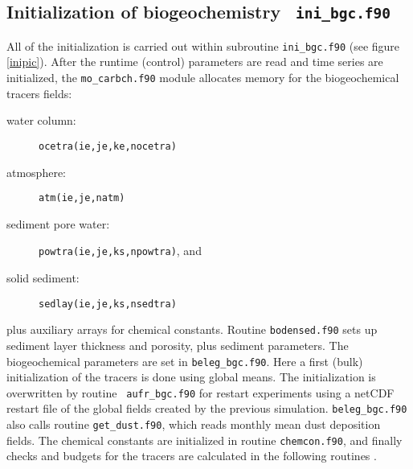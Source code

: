 \documentclass[11pt,a4paper,fleqn,twoside]{article}
\begin{document}
\subsection{\label{initialization}Initialization  of biogeochemistry {\tt
ini\_bgc.f90}}

All of the initialization is carried out within subroutine {\tt ini\_bgc.f90}
(see figure \ref{inipic}). After the runtime (control) parameters are read and
time series are initialized, the {\tt mo\_carbch.f90} module allocates memory
for the biogeochemical tracers fields:

\begin{description} 
\item[water column:] {\tt ocetra(ie,je,ke,nocetra)}
\item[atmosphere:] {\tt atm(ie,je,natm)}
\item[sediment pore water:] {\tt powtra(ie,je,ks,npowtra)}, and
\item[solid sediment:] {\tt sedlay(ie,je,ks,nsedtra)}
\end{description}

plus auxiliary arrays for chemical constants. Routine {\tt bodensed.f90} sets
up sediment layer thickness and porosity, plus sediment parameters.  The
biogeochemical parameters are set in {\tt beleg\_bgc.f90}. Here  a first (bulk)
initialization of the tracers is done using global means. 
The initialization is overwritten by routine {\tt
aufr\_bgc.f90} for restart experiments using a netCDF restart file of the 
global fields created by the previous simulation.  
{\tt beleg\_bgc.f90} also calls routine {\tt get\_dust.f90}, which
reads monthly mean dust deposition fields.  The chemical constants are initialized in
routine {\tt chemcon.f90}, and finally checks and budgets for the tracers are
calculated in the following routines {\tt }.
\end{document}
